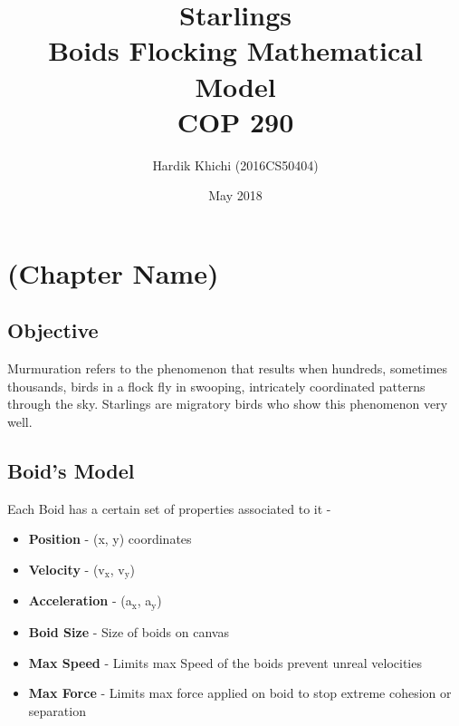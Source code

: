 \documentclass{article}
\title{Starlings \\ Boids Flocking Mathematical Model \\ COP 290} %
\author{Hardik Khichi (2016CS50404)} %
\date{May 2018} %
\begin{document}
\maketitle %

\tableofcontents

\chapter{(Chapter Name)}

\newpage


\section{Objective}

Murmuration refers to the phenomenon that results when hundreds, sometimes thousands, birds in a flock fly in swooping, intricately coordinated patterns through the sky. Starlings are migratory birds who show this phenomenon very well.

\section{Boid's Model}

Each Boid has a certain set of properties associated to it -

\begin{itemize}
    \item \textbf{Position} - (x, y) coordinates 
    \item \textbf{Velocity} - (v$_{\text{x}}$, v$_{\text{y}}$)
    \item \textbf{Acceleration} - (a$_{\text{x}}$, a$_{\text{y}}$) 
    \item \textbf{Boid Size} - Size of boids on canvas
    \item \textbf{Max Speed} - Limits max Speed of the boids prevent unreal velocities
    \item \textbf{Max Force} - Limits max force applied on boid to stop extreme cohesion or separation
\end{itemize}
\end{document}
